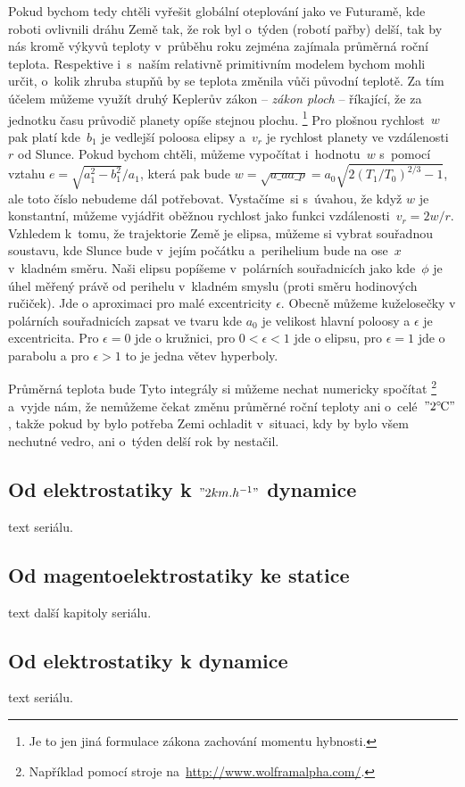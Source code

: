 \documentclass[twoside,fykos]{fksserie}
\begin{document}
Pokud bychom tedy chtěli vyřešit globální oteplování jako ve Futuramě,
kde roboti ovlivnili dráhu Země tak, že rok byl o~týden (robotí pařby)
delší, tak by nás kromě výkyvů teploty v~průběhu roku zejména zajímala
průměrná roční teplota. Respektive i~s~naším relativně primitivním modelem
bychom mohli určit, o~kolik zhruba stupňů by se teplota změnila vůči 
původní teplotě. Za tím účelem můžeme využít druhý Keplerův zákon -- {\it zákon
ploch} -- říkající, že za jednotku času průvodič planety opíše stejnou plochu.%
\footnote{Je to jen jiná formulace zákona zachování momentu hybnosti.}
Pro plošnou rychlost~$w$ pak platí
kde~$b_1$ je vedlejší poloosa elipsy a~$v_r$ je rychlost planety ve 
vzdálenosti~$r$ od Slunce. Pokud bychom chtěli, můžeme vypočítat
i~hodnotu~$w$ s~pomocí vztahu $e = {\sqrt{a_1^2 - b_1^2}}/{a_1}$, 
která pak bude $w = \sqrt{a\_a a\_p} = a_0 
\sqrt{2 \left( {T_1}/{T_0} \right) ^{2/3} -1 }$, ale toto číslo
nebudeme dál potřebovat. Vystačíme~si s~úvahou, že když $w$ je 
konstantní, můžeme vyjádřit oběžnou rychlost jako funkci vzdálenosti~$v_r =
{2w}/{r}$.
Vzhledem k~tomu, že trajektorie Země je elipsa,
můžeme si vybrat souřadnou soustavu, kde Slunce bude v~jejím počátku
a~perihelium bude na ose~$x$ v~kladném směru. Naši elipsu popíšeme v~polárních 
souřadnicích jako 
kde~$\phi$ je úhel měřený právě od perihelu v~kladném smyslu (proti směru 
hodinových ručiček). Jde o aproximaci pro malé excentricity $\epsilon$. 
Obecně můžeme kuželosečky v polárních souřadnicích zapsat ve tvaru 
kde $a_0$ je velikost hlavní poloosy a $\epsilon$ je excentricita. Pro 
$\epsilon=0$ jde o kružnici, pro $0<\epsilon<1$ jde o elipsu, pro 
$\epsilon=1$ jde o parabolu a pro $\epsilon>1$ to je jedna větev hyperboly.

Průměrná teplota bude 
Tyto integrály si můžeme nechat numericky spočítat%
\footnote{Například pomocí stroje na~\url{http://www.wolframalpha.com/}.}
a~vyjde nám, že nemůžeme čekat změnu průměrné roční teploty ani o~celé~$"2 ^\circ\mskip-2mu\mathrm{C}"$, 
takže pokud by bylo potřeba Zemi ochladit v~situaci, kdy by bylo všem 
nechutné vedro, ani o~týden delší rok by nestačil.



\subsection[Od elektrostatiky k 2 km/h dynamice]{Od elektrostatiky k $"2 km.h^{-1}"$ dynamice}
text seriálu.

\subsection{Od magentoelektrostatiky ke statice}
text další kapitoly seriálu.

\subsection{Od elektrostatiky k dynamice}
text seriálu.

\resultsheading


\makefooter %
\end{document}
